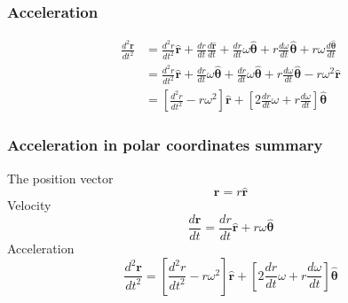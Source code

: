 \subsubsection{Acceleration}

\begin{align}\label{eq:acceleration}
\frac{ d^2 \bm{r}}{ d t^2} &= \frac{ d^2 r}{d t^2} \hat{\bm{r}} + \frac{d r}{d t} \frac{d \hat{\bm{r}}}{d t} +\frac{d r}{d t} \omega \hat{\bm{\theta}} +r \frac{d \omega}{d t} \hat{\bm{\theta}}+r \omega \frac{d \hat{\bm{\theta}}}{d t} \nonumber \\
&=  \frac{ d^2 r}{d t^2} \hat{\bm{r}} + \frac{d r}{d t} \omega \hat{\bm{\theta}} +\frac{d r}{d t} \omega \hat{\bm{\theta}} +r \frac{d \omega}{d t} \hat{\bm{\theta}}-r \omega^2 \hat{\bm{r}} \nonumber \\
&=\left[  \frac{ d^2 r}{d t^2} -r \omega^2 \right] \hat{\bm{r}} + \left[ 2 \frac{d r}{d t} \omega + r \frac{ d \omega}{d t} \right] \hat{\bm{\theta}}
\end{align}

\begin{framed}
\subsubsection*{Acceleration in polar coordinates summary}
The position vector
\begin{equation*}
\bm{r}=r \hat{\bm{r}}
\end{equation*}
Velocity
\begin{equation*}\label{eq:vel}
\frac{d \bm{r}}{d t} =\frac{d r}{d t} \hat{\bm{r}} + r \omega \hat{\bm{\theta}}
\end{equation*}
Acceleration
\begin{equation*}
\frac{ d^2 \bm{r}}{ d t^2} =\left[  \frac{ d^2 r}{d t^2} -r \omega^2 \right] \hat{\bm{r}} + \left[ 2 \frac{d r}{d t} \omega + r \frac{ d \omega}{d t} \right] \hat{\bm{\theta}}
\end{equation*}
\end{framed}